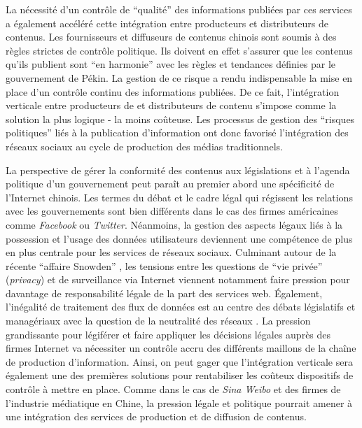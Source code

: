 La nécessité d'un contrôle de ``qualité'' des informations publiées par ces services a également accéléré cette intégration entre producteurs et distributeurs de contenus. Les fournisseurs et diffuseurs de contenus chinois sont soumis à des règles strictes de contrôle politique. Ils doivent en effet s'assurer que les contenus qu'ils publient sont ``en harmonie'' avec les règles et tendances définies par le gouvernement de Pékin. La gestion de ce risque a rendu indispensable la mise en place d'un contrôle continu des informations publiées. De ce fait, l'intégration verticale entre producteurs de et distributeurs de contenu s'impose comme la solution la plus logique - la moins coûteuse. Les processus de gestion des ``risques politiques'' liés à la publication d'information  ont donc favorisé l'intégration des réseaux sociaux au cycle de production des médias traditionnels.

La perspective de gérer la conformité des contenus aux législations et à l'agenda politique d'un gouvernement peut paraît au premier abord une spécificité de l'Internet chinois. Les termes du débat et le cadre légal qui régissent les relations avec les gouvernements sont bien différents dans le cas des firmes américaines comme \textit{Facebook} ou \textit{Twitter}. Néanmoins, la gestion des aspects légaux liés à la possession et l'usage des données utilisateurs deviennent une compétence de plus en plus centrale pour les services de réseaux sociaux. Culminant autour de la récente ``affaire Snowden'' \citep{Greenwald2013}, les tensions entre les questions de ``vie privée'' (\textit{privacy}) et de surveillance via Internet viennent notamment faire pression pour davantage de responsabilité légale de la part des services web. Également, l'inégalité de traitement des flux de données est au centre des débats législatifs et managériaux avec la question de la neutralité des réseaux \citep{Schafer2011}. La pression grandissante pour légiférer et faire appliquer les décisions légales auprès des firmes Internet va nécessiter un contrôle accru des différents maillons de la chaîne de production d'information. Ainsi, on peut gager que l'intégration verticale sera également une des premières solutions pour rentabiliser les coûteux dispositifs de contrôle à mettre en place. Comme dans le cas de \textit{Sina Weibo} et des firmes de l'industrie médiatique en Chine, la pression légale et politique pourrait amener à une intégration des services de production et de diffusion de contenus.

